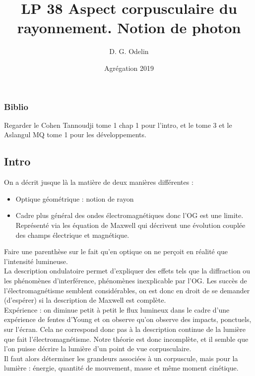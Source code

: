 \documentclass[12pt,prb,aps,epsf]{article}
\begin{document}
	
	\title{LP 38 Aspect corpusculaire du rayonnement. Notion de photon}
		\author{D. G. Odelin}
		\date{Agrégation 2019}
		
	\maketitle
	
	\tableofcontents
	
	\pagebreak
\subsubsection{Biblio}
Regarder le Cohen Tannoudji tome 1 chap 1 pour l'intro, et le tome 3 et le Aslangul MQ tome 1 pour les développements.

\subsection{Intro}
On a décrit jusque là la matière de deux manières différentes :
\begin{itemize}
	\item Optique géométrique : notion de rayon 
	\item Cadre plus général des ondes électromagnétiques donc l'OG est une limite. Représenté via les équation de Maxwell qui décrivent une évolution couplée des champs électrique et magnétique.
\end{itemize}
Faire une parenthèse sur le fait qu'en optique on ne perçoit en réalité que l'intensité lumineuse.\\

La description ondulatoire permet d'expliquer des effets tels que la diffraction ou les phénomènes d'interférence, phénomènes inexplicable par l'OG. Les succès de l'électromagnétisme semblent considérables, on est donc en droit de se demander (d'espérer) si la description de Maxwell est complète.\\

Expérience : on diminue petit à petit le flux lumineux dans le cadre d'une expérience de fentes d'Young et on observe qu'on observe des impacts, ponctuels, sur l'écran. Cela ne correspond donc pas à la description continue de la lumière que fait l'électromagnétisme. Notre théorie est donc incomplète, et il semble que l'on puisse décrire la lumière d'un point de vue corpusculaire.\\

Il faut alors déterminer les grandeurs associées à un corpuscule, mais pour la lumière : énergie, quantité de mouvement, masse et même moment cinétique.
\end{document}
